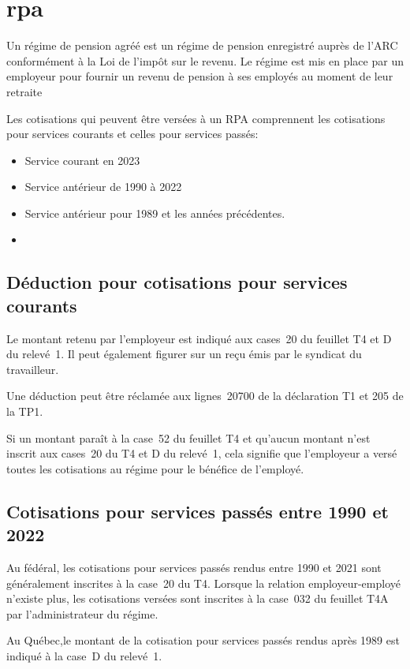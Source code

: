 \section{\acrfull{rpa}}
\begin{intro}
	Un régime de pension agréé est un régime de pension enregistré auprès de l'ARC conformément à la Loi de l'impôt sur le revenu. Le régime est mis en place par un employeur pour fournir un revenu de pension à ses employés au moment de leur retraite
\end{intro}
Les cotisations qui peuvent être versées à un RPA comprennent les cotisations pour services courants et celles pour services passés:
\begin{itemize}
	\item Service courant en 2023
	\item Service antérieur de 1990 à 2022
	\item Service antérieur pour 1989 et les années précédentes.
	\item 
\end{itemize}


\subsection{Déduction pour cotisations pour services courants}
Le montant retenu par l'employeur est indiqué aux cases~20 du feuillet T4 et D du relevé~1. Il peut également figurer sur un reçu émis par le syndicat du travailleur.

Une déduction peut être réclamée aux lignes~20700 de la déclaration T1 et 205 de la TP1.

Si un montant paraît à la case~52 du feuillet T4 et qu'aucun montant n'est inscrit aux cases~20 du T4 et D du relevé~1, cela signifie que l'employeur a versé toutes les cotisations au régime pour le bénéfice de l'employé.


\subsection{Cotisations pour services passés entre 1990 et 2022}
Au fédéral, les cotisations pour services passés rendus entre 1990 et 2021 sont généralement inscrites à la case~20 du T4. Lorsque la relation employeur-employé n'existe plus, les cotisations versées sont inscrites à la case~032 du feuillet T4A par l'administrateur du régime.

Au Québec,le montant de la cotisation pour services passés rendus après 1989 est indiqué à la case~D du relevé~1.

